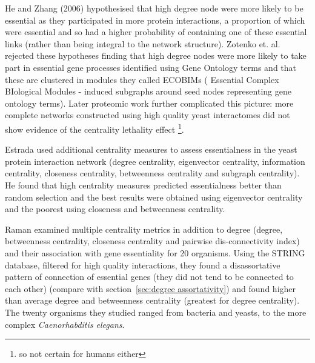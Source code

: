 He and Zhang (2006)\cite{he2006hubs} hypothesised that high degree node were more likely to be essential as they participated in more protein interactions, a proportion of which were essential and so had a higher probability of containing one of these essential links (rather than being integral to the network structure). Zotenko et. al. \cite{zotenko2008hubs} rejected these hypotheses finding that high degree nodes were more likely to take part in essential gene processes identified using Gene Ontology terms and that these are clustered in modules they called ECOBIMs ( Essential Complex BIological Modules - induced subgraphs around seed nodes representing gene ontology terms).  
Later proteomic work further complicated this picture: more complete networks constructed using high quality yeast interactomes did not show evidence of the centrality lethality effect\cite{milenkovic2011dominating} \cite{yu2008high} \cite{ratmann2009evidence}\footnote{so not certain for humans either}. 

Estrada \cite{estrada2006virtual} used additional centrality measures to assess essentialness in the yeast protein interaction network (degree centrality, eigenvector centrality, information centrality, closeness centrality, betweenness centrality and subgraph centrality). He found that high centrality measures predicted essentialness better than random selection and the best results were obtained using eigenvector centrality and the poorest using closeness and betweenness centrality. 

Raman \cite{raman2014organisational} examined multiple centrality metrics in addition to degree (degree, betweenness centrality, closeness centrality and pairwise dis-connectivity index) and their association with gene essentiality for 20 organisms. Using the STRING database, filtered for high quality interactions, they found a disassortative pattern of connection of essential genes (they did not tend to be connected to each other)  (compare with section~\ref{sec:degree assortativity})  and found higher than average degree and betweenness centrality (greatest for degree centrality). The twenty organisms they studied ranged from bacteria and yeasts, to the more complex \textit{Caenorhabditis elegans}.





